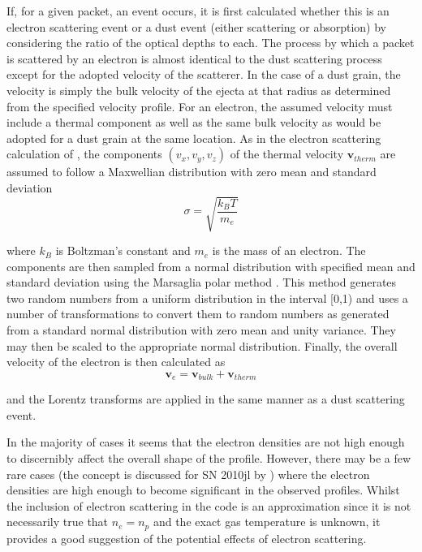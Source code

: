         If, for a given packet, an event occurs, it is first calculated whether this is an electron scattering event or a dust event (either scattering or absorption) by considering the ratio of the optical depths to each. The process by which a packet is scattered by an electron is almost identical to the dust scattering process except for the adopted velocity of the scatterer.  In the case of a dust grain, the velocity is simply the bulk velocity of the ejecta at that radius as determined from the specified velocity profile.  For an electron, the assumed velocity must include a thermal component as well as the same bulk velocity as would be adopted for a dust grain at the same location.  As in the electron scattering calculation of \citet{Hillier1991}, the components $(v_x,v_y,v_z)$ of the thermal velocity $\boldsymbol{v}_{therm}$ are assumed to follow a Maxwellian distribution with zero mean and standard deviation 
        \begin{equation}
        \label{eqn:sigma_maxwell}
        \sigma=\sqrt{\frac{k_BT}{m_e}}
        \end{equation}

        \noindent where $k_B$ is Boltzman's constant and $m_e$ is the mass of an electron.  The components are then sampled from a normal distribution with specified mean and standard deviation using the Marsaglia polar method \citep{Marsaglia1964}.  This method generates two random numbers from a uniform distribution in the interval [0,1) and uses a number of transformations to convert them to random numbers as generated from a standard normal distribution with zero mean and unity variance.  They may then be scaled to the appropriate normal distribution.  Finally, the overall velocity of the electron is then calculated as 
        \begin{equation}
        \boldsymbol{v}_e=\boldsymbol{v}_{bulk}+\boldsymbol{v}_{therm}
        \end{equation}

        and the Lorentz transforms are applied in the same manner as a dust scattering event.

        In the majority of cases it seems that the electron densities are not high enough to discernibly affect the overall shape of the profile.  However, there may be a few rare cases (the concept is discussed for SN 2010jl by \citet{Fransson2013}) where the electron densities are high enough to become significant in the observed profiles.  Whilst the inclusion of electron scattering in the code is an approximation since it is not necessarily true that $n_e=n_p$ and the exact gas temperature is unknown, it provides a good suggestion of the potential effects of electron scattering.	
        

